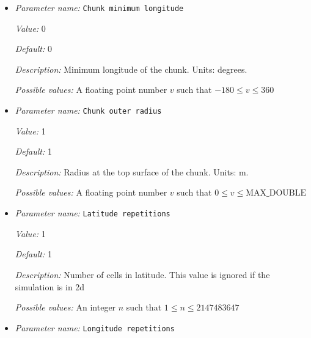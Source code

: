 \begin{itemize}
{\it Default:} 0


{\it Description:} Minimum latitude of the chunk. This value is ignored if the simulation is in 2d. Units: degrees.


{\it Possible values:} A floating point number $v$ such that $-90 \leq v \leq 90$
\item {\it Parameter name:} {\tt Chunk minimum longitude}
\label{parameters:Geometry model/Chunk/Chunk minimum longitude}
\label{parameters:Geometry_20model/Chunk/Chunk_20minimum_20longitude}


{\it Value:} 0


{\it Default:} 0


{\it Description:} Minimum longitude of the chunk. Units: degrees.


{\it Possible values:} A floating point number $v$ such that $-180 \leq v \leq 360$
\item {\it Parameter name:} {\tt Chunk outer radius}
\label{parameters:Geometry model/Chunk/Chunk outer radius}
\label{parameters:Geometry_20model/Chunk/Chunk_20outer_20radius}


{\it Value:} 1


{\it Default:} 1


{\it Description:} Radius at the top surface of the chunk. Units: m.


{\it Possible values:} A floating point number $v$ such that $0 \leq v \leq \text{MAX\_DOUBLE}$
\item {\it Parameter name:} {\tt Latitude repetitions}
\label{parameters:Geometry model/Chunk/Latitude repetitions}
\label{parameters:Geometry_20model/Chunk/Latitude_20repetitions}


{\it Value:} 1


{\it Default:} 1


{\it Description:} Number of cells in latitude. This value is ignored if the simulation is in 2d


{\it Possible values:} An integer $n$ such that $1\leq n \leq 2147483647$
\item {\it Parameter name:} {\tt Longitude repetitions}
\label{parameters:Geometry model/Chunk/Longitude repetitions}
\label{parameters:Geometry_20model/Chunk/Longitude_20repetitions}



\end{itemize}
